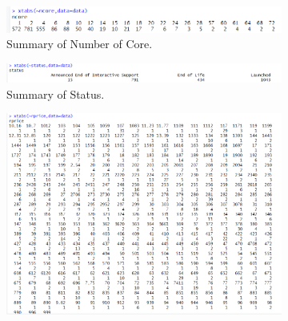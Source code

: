 \begin{figure}[!h]
    \begin{subfigure}[b]{0.49\textwidth}
        \centering
        \includegraphics[width=\linewidth,height=0.4\linewidth]{graphics/new_graphics/Xtabs/xtabs-ncore.png}
        \caption{Summary of Number of Core.}
    \end{subfigure}
    \hfill
     \begin{subfigure}[b]{0.49\textwidth}
        \centering
        \includegraphics[width=\linewidth,height=0.4\linewidth]{graphics/new_graphics/Xtabs/xtabs-status.png}
        \caption{Summary of Status.}
    \end{subfigure}
    \begin{subfigure}[b]{0.49\textwidth}
        \centering
        \includegraphics[width=\linewidth]{graphics/new_graphics/Xtabs/xtabs-rprice.png}

\end{subfigure}
\end{figure}
